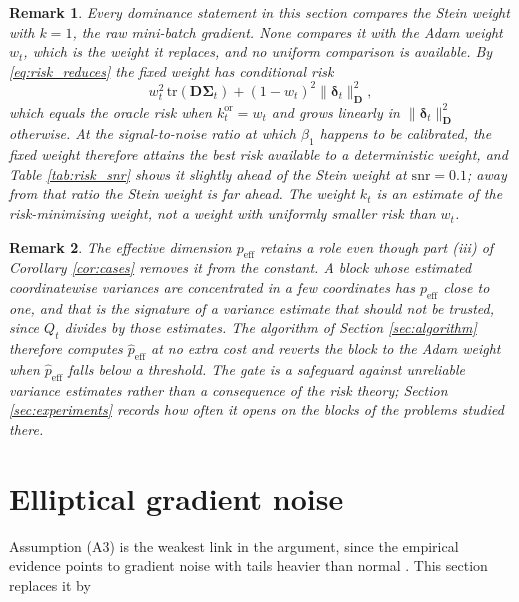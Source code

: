 \documentclass[pdflatex,sn-mathphys-num]{sn-jnl}%
\theoremstyle{thmstyleone}%
\theoremstyle{thmstyletwo}%
\newtheorem{remark}{Remark}%
\theoremstyle{thmstylethree}%
\newenvironment{revblock}{\color{blue}}{}
\newcommand{\peff}{p_{\mathrm{eff}}}
\newcommand{\tr}{\mathrm{tr}}
\begin{document}
\begin{revblock}
\begin{remark}
\label{rem:benchmark}
Every dominance statement in this section compares the Stein weight with $k=1$, the raw mini-batch gradient. None compares it with the Adam weight $w_t$, which is the weight it replaces, and no uniform comparison is available. By \eqref{eq:risk_reduces} the fixed weight has conditional risk
\begin{equation}
\label{eq:fixed_risk}
w_t^{2}\,\tr(\bm D\bm\Sigma_t)+(1-w_t)^{2}\|\bm\delta_t\|^2_{\bm D},
\end{equation}
which equals the oracle risk when $k^{\mathrm{or}}_t=w_t$ and grows linearly in $\|\bm\delta_t\|^2_{\bm D}$ otherwise. At the signal-to-noise ratio at which $\beta_1$ happens to be calibrated, the fixed weight therefore attains the best risk available to a deterministic weight, and Table \ref{tab:risk_snr} shows it slightly ahead of the Stein weight at $\mathrm{snr}=0.1$; away from that ratio the Stein weight is far ahead. The weight $k_t$ is an estimate of the risk-minimising weight, not a weight with uniformly smaller risk than $w_t$.
\end{remark}
\end{revblock}

\begin{remark}
\label{rem:gate}
The effective dimension $\peff$ retains a role even though part (iii) of Corollary \ref{cor:cases} removes it from the constant. A block whose estimated coordinatewise variances are concentrated in a few coordinates has $\peff$ close to one, and that is the signature of a variance estimate that should not be trusted, since $Q_t$ divides by those estimates. The algorithm of Section \ref{sec:algorithm} therefore computes $\hat\peff$ at no extra cost and reverts the block to the Adam weight when $\hat\peff$ falls below a threshold. The gate is a safeguard against unreliable variance estimates rather than a consequence of the risk theory; Section \ref{sec:experiments} records how often it opens on the blocks of the problems studied there.
\end{remark}

\section{Elliptical gradient noise}
\label{sec:elliptical}

Assumption (A3) is the weakest link in the argument, since the empirical evidence points to gradient noise with tails heavier than normal \cite{simsekli2019, panigrahi2019, gurbuzbalaban2021}. This section replaces it by
\end{document}
